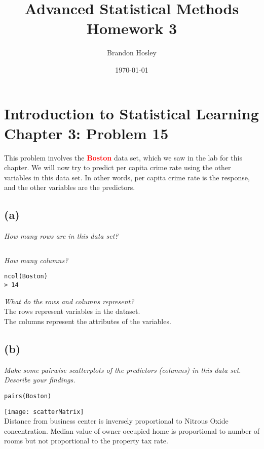 \documentclass[a4paper,man,natbib]{apa6}
\title{Advanced Statistical Methods Homework 3}
\author{Brandon Hosley}
\date{\today}
\affiliation{University of Illinois - Springfield}
\begin{document}
\maketitle
\singlespacing

\section{Introduction to Statistical Learning \\ Chapter 3: Problem 15}
This problem involves the \textbf{\textcolor{red}{Boston}} data set, 
which we saw in the lab for this chapter. 
We will now try to predict per capita crime rate
using the other variables in this data set. 
In other words, per capita crime rate is the response, 
and the other variables are the predictors.


\subsection{(a)} 
\emph{How many rows are in this data set?} \\
\begin{verbatim}

\end{verbatim}
\emph{How many columns?}  \\
\begin{verbatim}
ncol(Boston)
> 14
\end{verbatim}
\emph{What do the rows and columns represent?} \\
The rows represent variables in the dataset. \\
The columns represent the attributes of the variables. \\

\subsection{(b)}
\emph{Make some pairwise scatterplots of the predictors (columns) in
this data set. Describe your findings.}
\begin{verbatim}
pairs(Boston)
\end{verbatim}
\texttt{[image: scatterMatrix]} \\
Distance from business center is inversely proportional to Nitrous Oxide concentration.
Median value of owner occupied home is proportional to number of rooms but not proportional to the property tax rate.
\end{document}
